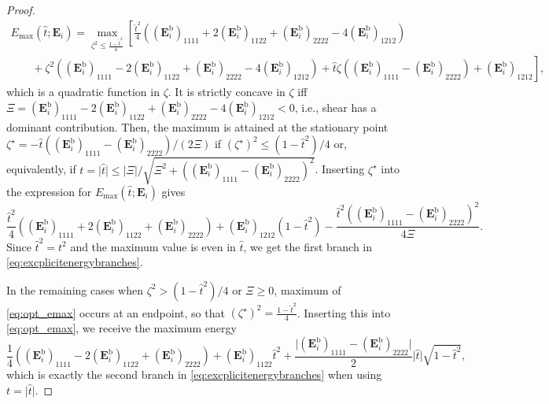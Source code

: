 \documentclass[preprint,3p]{elsarticle}
\newcommand{\tensf}[1]{\bm{\mathbf{#1}}}            %
\newcommand{\Ei}{\tensf{E}_i}                       %
\begin{document}
\begin{proof}
\begin{multline}
    E_{\max}(\hat{t};\Ei) = \max_{\zeta^2 \le \frac{1 - \hat{t}^2}{4}} \left[\frac{\hat{t}^2}{4}\left((\Ei^{\mathrm{b}})_{1111} + 2(\Ei^{\mathrm{b}})_{1122} + (\Ei^{\mathrm{b}})_{2222} - 4(\Ei^{\mathrm{b}})_{1212}\right)\right.\\
    \left.\phantom{\frac{1 - \hat{t}^2}{4}}+ \zeta^2 \left((\Ei^{\mathrm{b}})_{1111} - 2(\Ei^{\mathrm{b}})_{1122} + (\Ei^{\mathrm{b}})_{2222} - 4(\Ei^{\mathrm{b}})_{1212}\right) + \hat{t} \zeta ((\Ei^{\mathrm{b}})_{1111} - (\Ei^{\mathrm{b}})_{2222}) + (\Ei^{\mathrm{b}})_{1212}\right],
\end{multline}
%
which is a quadratic function in $\zeta$. It is strictly concave in $\zeta$ iff $\Xi = (\Ei^{\mathrm{b}})_{1111} - 2(\Ei^{\mathrm{b}})_{1122} + (\Ei^{\mathrm{b}})_{2222} - 4(\Ei^{\mathrm{b}})_{1212} < 0$, i.e., shear has a dominant contribution. Then, the maximum is attained at the stationary point $\zeta^\star = -\hat{t} ((\Ei^{\mathrm{b}})_{1111} - (\Ei^{\mathrm{b}})_{2222})/(2\Xi)$ if $(\zeta^\star)^2 \le (1-\hat{t}^2)/4$ or, equivalently, if $t = \lvert \hat{t}\rvert \le \lvert \Xi \rvert /\sqrt{\Xi^2 + ((\Ei^{\mathrm{b}})_{1111}-(\Ei^{\mathrm{b}})_{2222})^2}$. Inserting $\zeta^\star$ into the expression for $E_{\max}(\hat{t};\Ei)$ gives
%
\begin{equation}
    \frac{\hat{t}^2}{4} ((\Ei^{\mathrm{b}})_{1111}+2(\Ei^{\mathrm{b}})_{1122}+(\Ei^{\mathrm{b}})_{2222}) + (\Ei^{\mathrm{b}})_{1212}(1-\hat{t}^2)
        - \frac{\hat{t}^2 ((\Ei^{\mathrm{b}})_{1111}-(\Ei^{\mathrm{b}})_{2222})^2}{4 \Xi}.
\end{equation}
%
Since $\hat{t}^2 = t^2$ and the maximum value is even in $\hat{t}$, we get the first branch in \eqref{eq:excplicitenergybranches}.

In the remaining cases when $\zeta^2 > (1-\hat{t}^2)/4$ or $\Xi\ge0$, maximum of \eqref{eq:opt_emax} occurs at an endpoint, so that $(\zeta^\star)^2 = \frac{1 - \hat{t}^2}{4}$. Inserting this into \eqref{eq:opt_emax}, we receive the maximum energy
%
\begin{equation}
    \frac{1}{4}((\Ei^{\mathrm{b}})_{1111}-2 (\Ei^{\mathrm{b}})_{1122}+(\Ei^{\mathrm{b}})_{2222})
        + (\Ei^{\mathrm{b}})_{1122} \hat{t}^2
        + \frac{\lvert (\Ei^{\mathrm{b}})_{1111}-(\Ei^{\mathrm{b}})_{2222}\rvert}{2} \lvert\hat{t}\rvert \sqrt{1-\hat{t}^2},
\end{equation}
%
which is exactly the second branch in \eqref{eq:excplicitenergybranches} when using $t=\lvert \hat{t}\rvert$.
\end{proof}
\end{document}
